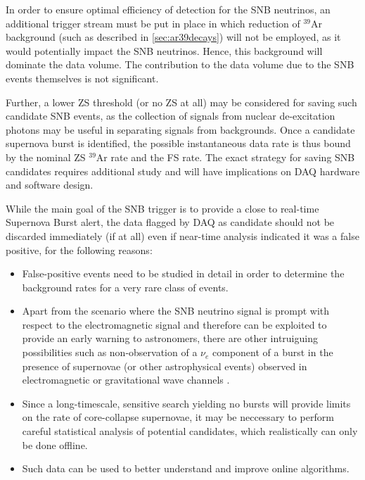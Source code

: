 In order to ensure optimal efficiency of detection for the SNB neutrinos,
an  additional trigger stream must be put in place in which
reduction of $^{39}$Ar background (such as described in \ref{sec:ar39decays}) will not be employed,
as it would potentially impact the SNB neutrinos. Hence, this background 
will dominate the data volume. The contribution to the data volume due to the SNB events
themselves is not significant.

Further, a lower ZS threshold (or no ZS at all) may be considered for saving such candidate SNB events, as the
collection of signals from nuclear de-excitation photons may be useful in separating signals from backgrounds.
Once a candidate supernova burst is identified, the possible instantaneous data rate is thus bound by the nominal
ZS $^{39}$Ar rate and the FS rate. The exact strategy for saving SNB candidates requires additional study
and will have implications on DAQ hardware and software design.

While the main goal of the SNB trigger is to provide a close to real-time Supernova Burst alert, the data
flagged by DAQ as candidate should not be discarded immediately (if at all) even if near-time analysis indicated it was a false positive,
for the following reasons:
\begin{itemize}

\item False-positive events need to be studied in detail in order to determine the background
rates for a very rare class of events.

\item Apart from the scenario where the SNB neutrino signal is prompt with respect to the electromagnetic signal
and therefore can be exploited to provide an early warning to astronomers, there are other intruiguing possibilities
such as non-observation of a $\nu_e$ component of a burst in the presence
of supernovae (or other astrophysical events) observed in electromagnetic or gravitational wave
channels \cite{cdr_vol2}.

\item Since a long-timescale, sensitive search yielding no bursts will provide limits on the rate of core-collapse
supernovae, it may be neccessary to perform careful statistical analysis of potential candidates, which realistically can only
be done offline.

\item Such data can be used to better understand and improve online algorithms.

\end{itemize}

